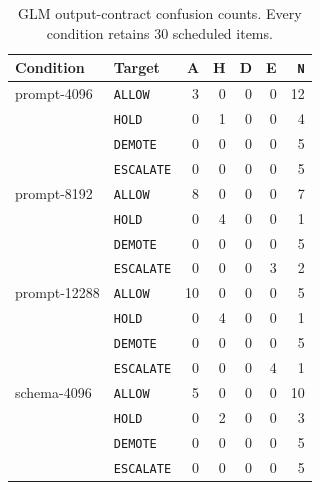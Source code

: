 \documentclass[10pt]{article}
\newcommand{\allow}{\texttt{ALLOW}}
\newcommand{\hold}{\texttt{HOLD}}
\newcommand{\demote}{\texttt{DEMOTE}}
\newcommand{\escalate}{\texttt{ESCALATE}}
\begin{document}
\begin{table}[htbp]
\centering
\footnotesize
\setlength{\tabcolsep}{3pt}
\caption{GLM output-contract confusion counts. Every condition retains 30 scheduled items.}
\label{tab:output-glm-confusion}
\begin{tabular}{@{}llrrrrr@{}}
\toprule
Condition & Target & A & H & D & E & \texttt{N} \\
\midrule
prompt-4096 & \allow{} & 3&0&0&0&12 \\
 & \hold{} & 0&1&0&0&4 \\
 & \demote{} & 0&0&0&0&5 \\
 & \escalate{} & 0&0&0&0&5 \\
\midrule
prompt-8192 & \allow{} & 8&0&0&0&7 \\
 & \hold{} & 0&4&0&0&1 \\
 & \demote{} & 0&0&0&0&5 \\
 & \escalate{} & 0&0&0&3&2 \\
\midrule
prompt-12288 & \allow{} & 10&0&0&0&5 \\
 & \hold{} & 0&4&0&0&1 \\
 & \demote{} & 0&0&0&0&5 \\
 & \escalate{} & 0&0&0&4&1 \\
\midrule
schema-4096 & \allow{} & 5&0&0&0&10 \\
 & \hold{} & 0&2&0&0&3 \\
 & \demote{} & 0&0&0&0&5 \\
 & \escalate{} & 0&0&0&0&5 \\
\bottomrule
\end{tabular}
\end{table}
\end{document}
